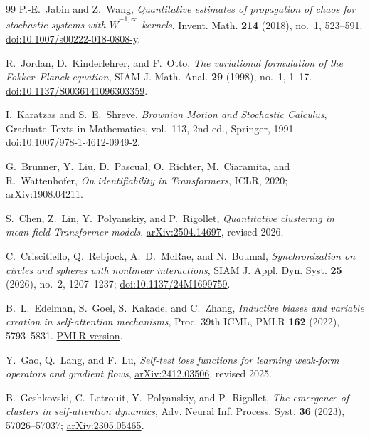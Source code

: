 \documentclass[11pt]{amsart}
\numberwithin{equation}{section}
\theoremstyle{plain}
\begin{document}
\begin{thebibliography}{99}
P.-E.~Jabin and Z.~Wang,
\emph{Quantitative estimates of propagation of chaos for stochastic systems
with $\dot W^{-1,\infty}$ kernels},
Invent. Math. \textbf{214} (2018), no.~1, 523--591.
\href{https://doi.org/10.1007/s00222-018-0808-y}
{doi:10.1007/s00222-018-0808-y}.

R.~Jordan, D.~Kinderlehrer, and F.~Otto,
\emph{The variational formulation of the Fokker--Planck equation},
SIAM J. Math. Anal. \textbf{29} (1998), no.~1, 1--17.
\href{https://doi.org/10.1137/S0036141096303359}
{doi:10.1137/S0036141096303359}.

I.~Karatzas and S.~E.~Shreve,
\emph{Brownian Motion and Stochastic Calculus},
Graduate Texts in Mathematics, vol.~113, 2nd ed., Springer, 1991.
\href{https://doi.org/10.1007/978-1-4612-0949-2}
{doi:10.1007/978-1-4612-0949-2}.

G.~Brunner, Y.~Liu, D.~Pascual, O.~Richter, M.~Ciaramita, and R.~Wattenhofer,
\emph{On identifiability in Transformers},
ICLR, 2020;
\href{https://arxiv.org/abs/1908.04211}{arXiv:1908.04211}.

S.~Chen, Z.~Lin, Y.~Polyanskiy, and P.~Rigollet,
\emph{Quantitative clustering in mean-field Transformer models},
\href{https://arxiv.org/abs/2504.14697}{arXiv:2504.14697}, revised 2026.

C.~Criscitiello, Q.~Rebjock, A.~D.~McRae, and N.~Boumal,
\emph{Synchronization on circles and spheres with nonlinear interactions},
SIAM J. Appl. Dyn. Syst. \textbf{25} (2026), no.~2, 1207--1237;
\href{https://doi.org/10.1137/24M1699759}{doi:10.1137/24M1699759}.

B.~L.~Edelman, S.~Goel, S.~Kakade, and C.~Zhang,
\emph{Inductive biases and variable creation in self-attention mechanisms},
Proc. 39th ICML, PMLR \textbf{162} (2022), 5793--5831.
\href{https://proceedings.mlr.press/v162/edelman22a.html}{PMLR version}.

Y.~Gao, Q.~Lang, and F.~Lu,
\emph{Self-test loss functions for learning weak-form operators and gradient
flows},
\href{https://arxiv.org/abs/2412.03506}{arXiv:2412.03506}, revised 2025.

B.~Geshkovski, C.~Letrouit, Y.~Polyanskiy, and P.~Rigollet,
\emph{The emergence of clusters in self-attention dynamics},
Adv. Neural Inf. Process. Syst. \textbf{36} (2023), 57026--57037;
\href{https://arxiv.org/abs/2305.05465}{arXiv:2305.05465}.


\end{thebibliography}
\end{document}
